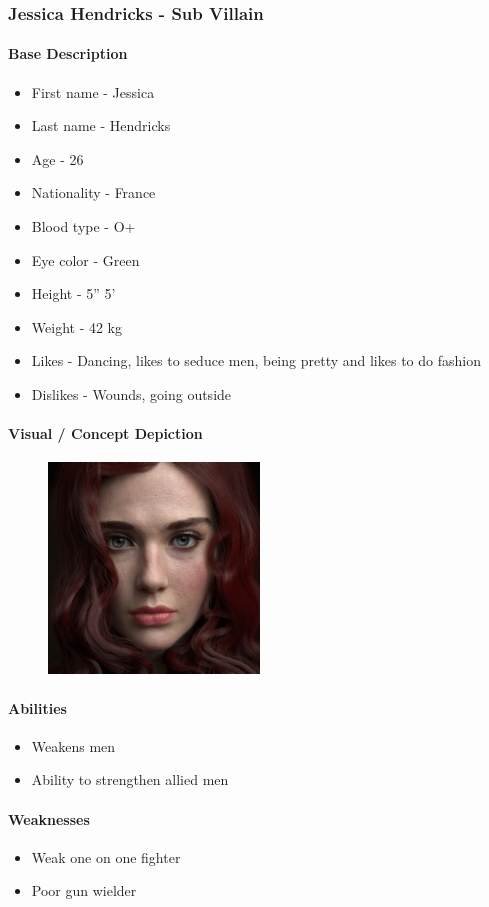 \subsubsection{Jessica Hendricks - Sub Villain}
	\paragraph{Base Description}\mbox{}
		\begin{itemize}
			\item First name - Jessica
			\item Last name - Hendricks
			\item Age - 26
			\item Nationality - France
			\item Blood type - O+
			\item Eye color - Green
			\item Height - 5” 5’
			\item Weight - 42 kg
			\item Likes - Dancing, likes to seduce men, being pretty and likes to do fashion
			\item Dislikes - Wounds, going outside
		\end{itemize}
	\paragraph{Visual / Concept Depiction}\mbox{}
		\begin{figure}[H]
			\centering
			\includegraphics[width=0.5\textwidth]{images/characters/jessica}
		\end{figure}
	\paragraph{Abilities}\mbox{}
		\begin{itemize}
			\item Weakens men
			\item Ability to strengthen allied men
		\end{itemize}
	\paragraph{Weaknesses}\mbox{}
		\begin{itemize}
			\item Weak one on one fighter
			\item Poor gun wielder
        \end{itemize}